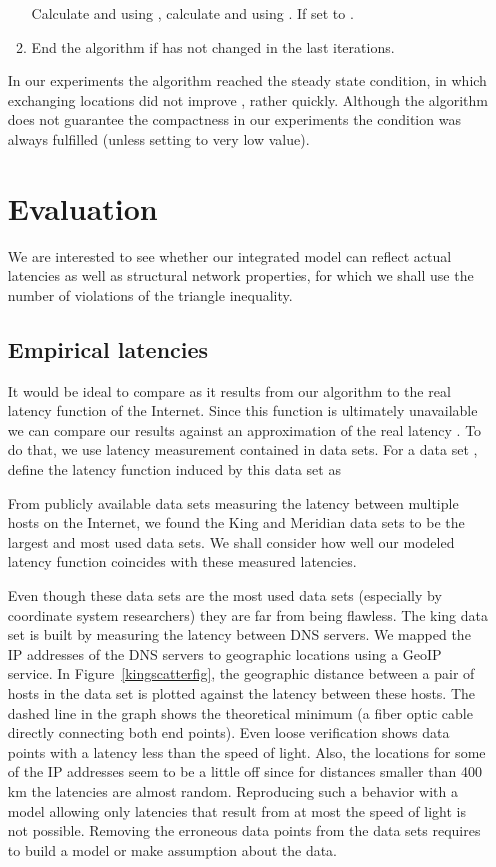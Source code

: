 \documentclass{sig-alternate-10pt}
\begin{document}
\begin{enumerate}
\begin{enumerate}
Calculate  and  using , calculate  and  using . If  set  to . 
\item End the algorithm if  has not changed in the last  iterations.
\end{enumerate}
In our experiments the algorithm reached the steady state condition,  in which exchanging locations did not improve ,  rather  quickly. Although the algorithm does not guarantee the compactness  in our experiments the condition was always fulfilled (unless setting  to very low value). 

\section{Evaluation}
\label{sec:eval-gener-graph}

We are interested to see whether our integrated model can reflect
actual latencies as well as structural network properties, for which
we shall use the number of violations of the triangle inequality. 

\subsection{Empirical latencies}
\label{sec:empirical-latencies}

It would be ideal to compare  as it results from our algorithm to the real latency function  of the Internet. Since this function is ultimately unavailable we can compare our results against an approximation of the real latency . To do that, we use latency measurement contained in data sets. For a data set  , define the latency function induced by this data set   as 


From publicly available data sets measuring the latency between multiple hosts on the Internet, we found the King \cite{IDES} and Meridian \cite{meridian} data sets to be the largest and most used data sets. 
We shall consider how well our modeled latency function  coincides with these measured latencies.

Even though these data sets are the most used data sets (especially by coordinate system researchers) they are far from being flawless. The king data set is built by measuring the latency between DNS servers. We mapped the IP addresses of the DNS servers to geographic locations using a GeoIP service. In Figure~\ref{kingscatterfig}, the geographic distance between a pair of hosts in the data set is plotted against the latency between these hosts.  The dashed line in the graph shows the  theoretical minimum (a fiber optic cable directly connecting both end points).
Even loose verification  shows data points with a latency less than the speed of light. Also, the locations for some of the IP addresses seem to be a little off since for distances smaller than 400 km the latencies are almost random. Reproducing such a behavior with a model allowing only latencies that result from at most the speed of light is not possible. Removing the erroneous data points from the data sets requires to build a model or make assumption about the data. 




\end{enumerate}
\end{document}
